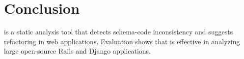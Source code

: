 \section{Conclusion}
\ETool is a static analysis tool that detects 
schema-code inconsistency and suggests refactoring in
web applications. Evaluation shows that \ETool is effective in analyzing large
open-source Rails and Django applications.